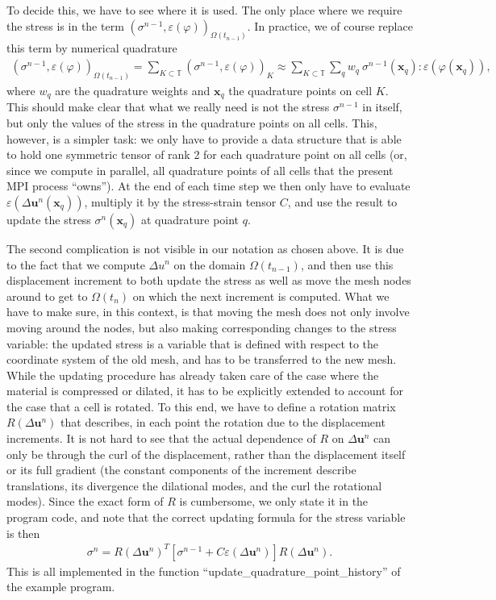 \documentclass{article}
\renewcommand{\vec}[1]{\mathbf{#1}}
\begin{document}
To decide this, we have to see where it is used. The only place where we
require the stress is in the term
$(\sigma^{n-1},\varepsilon(\varphi))_{\Omega(t_{n-1})}$. In practice, we of
course replace this term by numerical quadrature
\begin{gather}
  (\sigma^{n-1},\varepsilon(\varphi))_{\Omega(t_{n-1})}
  =
  \sum_{K\subset {\mathbb{T}}}
  (\sigma^{n-1},\varepsilon(\varphi))_K
  \approx
  \sum_{K\subset {\mathbb{T}}}
  \sum_q
  w_q \ \sigma^{n-1}(\vec x_q) : \varepsilon(\varphi(\vec x_q)),
\end{gather}
where $w_q$ are the quadrature weights and $\vec x_q$ the quadrature points on
cell $K$. This should make clear that what we really need is not the stress
$\sigma^{n-1}$ in itself, but only the values of the stress in the quadrature
points on all cells. This, however, is a simpler task: we only have to provide
a data structure that is able to hold one symmetric tensor of rank 2 for each
quadrature point on all cells (or, since we compute in parallel, all
quadrature points of all cells that the present MPI process ``owns''). At the
end of each time step we then only have to evaluate $\varepsilon(\Delta \vec
u^n(\vec x_q))$, multiply it by the stress-strain tensor $C$, and use the
result to update the stress $\sigma^n(\vec x_q)$ at quadrature point $q$.

The second complication is not visible in our notation as chosen above. It is
due to the fact that we compute $\Delta u^n$ on the domain $\Omega(t_{n-1})$,
and then use this displacement increment to both update the stress as well as
move the mesh nodes around to get to $\Omega(t_n)$ on which the next increment
is computed. What we have to make sure, in this context, is that moving the
mesh does not only involve moving around the nodes, but also making
corresponding changes to the stress variable: the updated stress is a variable
that is defined with respect to the coordinate system of the old mesh, and has
to be transferred to the new mesh. While the updating procedure has already
taken care of the case where the material is compressed or dilated, it has to
be explicitly extended to account for the case that a cell is rotated. To this
end, we have to define a rotation matrix $R(\Delta \vec u^n)$ that describes,
in each point the rotation due to the displacement increments. It is not hard
to see that the actual dependence of $R$ on $\Delta \vec u^n$ can only be
through the curl of the displacement, rather than the displacement itself or
its full gradient (the constant components of the increment describe
translations, its divergence the dilational modes, and the curl the rotational
modes). Since the exact form of $R$ is cumbersome, we only state it in the
program code, and note that the correct updating formula for the stress
variable is then
\begin{gather}
  \label{eq:stress-update+rot}
  \sigma^n
  = 
  R(\Delta \vec u^n)^T 
  [\sigma^{n-1} + C \varepsilon (\Delta \vec u^n)]
  R(\Delta \vec u^n).
\end{gather}
This is all implemented in the function
``update\_\-quadrature\_\-point\_history'' of the example program.
\end{document}
